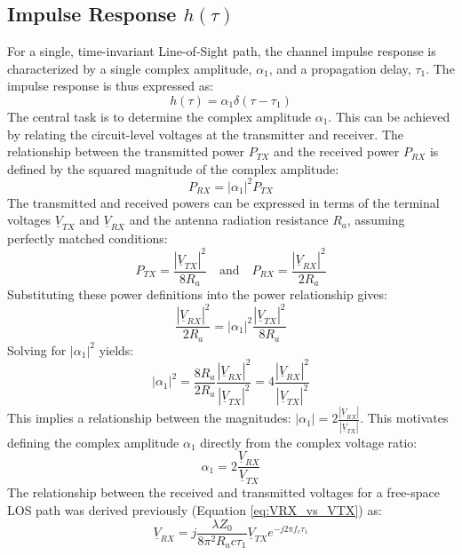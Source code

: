 \subsection{Impulse Response $h(\tau)$}
For a single, time-invariant Line-of-Sight path, the channel impulse response is characterized by a single complex amplitude, $\alpha_1$, and a propagation delay, $\tau_1$. The impulse response is thus expressed as:
\begin{equation}
	h(\tau) = \alpha_1 \delta(\tau - \tau_1)
\end{equation}
The central task is to determine the complex amplitude $\alpha_1$. This can be achieved by relating the circuit-level voltages at the transmitter and receiver. The relationship between the transmitted power $P_{TX}$ and the received power $P_{RX}$ is defined by the squared magnitude of the complex amplitude:
\begin{equation}
	P_{RX} = |\alpha_1|^2 P_{TX}
\end{equation}
The transmitted and received powers can be expressed in terms of the terminal voltages $\underline{V}_{TX}$ and $\underline{V}_{RX}$ and the antenna radiation resistance $R_a$, assuming perfectly matched conditions:
\begin{equation}
	P_{TX} = \frac{|\underline{V}_{TX}|^2}{8R_a} \quad \text{and} \quad P_{RX} = \frac{|\underline{V}_{RX}|^2}{2R_a}
\end{equation}
Substituting these power definitions into the power relationship gives:
\begin{equation}
	\frac{|\underline{V}_{RX}|^2}{2R_a} = |\alpha_1|^2 \frac{|\underline{V}_{TX}|^2}{8R_a}
\end{equation}
Solving for $|\alpha_1|^2$ yields:
\begin{equation}
	|\alpha_1|^2 = \frac{8R_a}{2R_a} \frac{|\underline{V}_{RX}|^2}{|\underline{V}_{TX}|^2} = 4 \frac{|\underline{V}_{RX}|^2}{|\underline{V}_{TX}|^2}
\end{equation}
This implies a relationship between the magnitudes: $|\alpha_1| = 2 \frac{|\underline{V}_{RX}|}{|\underline{V}_{TX}|}$. This motivates defining the complex amplitude $\alpha_1$ directly from the complex voltage ratio:
\begin{equation}
	\alpha_1 = 2 \frac{\underline{V}_{RX}}{\underline{V}_{TX}}
	\label{eq:alpha_from_voltages}
\end{equation}
The relationship between the received and transmitted voltages for a free-space LOS path was derived previously (Equation \ref{eq:VRX_vs_VTX}) as:
\begin{equation}
	\underline{V}_{RX} = j \frac{\lambda Z_0}{8\pi^2 R_a c\tau_1} \underline{V}_{TX} e^{-j2\pi f_c \tau_1}
\end{equation}
